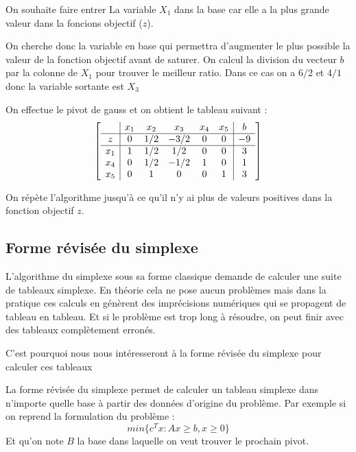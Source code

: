 \documentclass[a4paper,10pt]{article}
\newcommand{\mehdi}[1]{\textcolor{white}{#1}}
\theoremstyle{plain}
\begin{document}
On souhaite faire entrer La variable $X_1$ dans la base car elle a la plus grande valeur dans la foncions objectif ($z$). 

On cherche donc la variable en base qui permettra d'augmenter le plus possible la valeur de la fonction objectif avant de saturer. On calcul la division du vecteur $b$ par la colonne de $X_1$ pour trouver le meilleur ratio. Dans ce cas on a $6/2$ et $4/1$ donc la variable sortante est $X_3$

On effectue le pivot de gauss et on obtient le tableau suivant : 
\begin{equation}
  \begin{bmatrix}
    \begin{array}{c|ccccc|c}
      \mehdi{.} & x_1 & x_2 & x_3 & x_4 & x_5 & b \\ \hline
      z  & 0 & 1/2 & -3/2 & 0 & 0 & -9 \\ \hline
      x_1 & 1 & 1/2 & 1/2 & 0 & 0 & 3 \\
      x_4 & 0 & 1/2 & -1/2 & 1 & 0 & 1 \\
      x_5 & 0 & 1 & 0 & 0 & 1 & 3 \\
    \end{array}
  \end{bmatrix}
\end{equation}

On répète l'algorithme jusqu'à ce qu'il n'y ai plus de valeurs positives dans la fonction objectif $z$.

\subsection{Forme révisée du simplexe}
L'algorithme du simplexe sous sa forme classique demande de calculer une suite de tableaux simplexe. En théorie cela ne pose aucun problèmes mais dans la pratique ces calculs en génèrent des imprécisions numériques qui se propagent de tableau en tableau. Et si le problème est trop long à résoudre, on peut finir avec des tableaux complètement erronés.

C'est pourquoi nous nous intéresseront à la forme révisée du simplexe pour calculer ces tableaux

La forme révisée du simplexe permet de calculer un tableau simplexe dans n'importe quelle base à partir des données d'origine du problème.
Par exemple si on reprend la formulation du problème : $$ min \{ c^Tx : Ax \geq b,x \geq 0 \} $$
Et qu'on note $B$ la base dans laquelle on veut trouver le prochain pivot.
\end{document}
